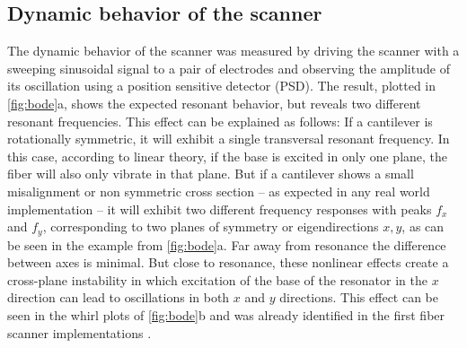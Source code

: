 \documentclass[10pt]{iopart}
\begin{document}
\subsection{Dynamic behavior of the scanner}
\label{sec:whirling}

The dynamic behavior of the scanner was measured by driving the scanner with a sweeping sinusoidal signal to a pair of electrodes and observing the amplitude of its oscillation using a position sensitive detector (PSD). The result, plotted in \autoref{fig:bode}a, shows the expected resonant behavior, but reveals two different resonant frequencies. This effect can be explained as follows: If a cantilever is rotationally symmetric, it will exhibit a single transversal resonant frequency. In this case, according to linear theory, if the base is excited in only one plane, the fiber will also only vibrate in that plane. But if a cantilever shows a small misalignment or non symmetric cross section -- as expected in any real world implementation -- it will exhibit two different frequency responses with peaks $f_x$ and $f_y$, corresponding to two planes of symmetry or eigendirections $x,y$, as can be seen in the example from \autoref{fig:bode}a. Far away from resonance the difference between axes is minimal. But close to resonance, these nonlinear effects create a cross-plane instability in which excitation of the base of the resonator in the $x$ direction can lead to oscillations in both $x$ and $y$ directions. This effect can be seen in the whirl plots of \autoref{fig:bode}b and was already identified in the first fiber scanner implementations \cite{Seibel2001}.
\end{document}
